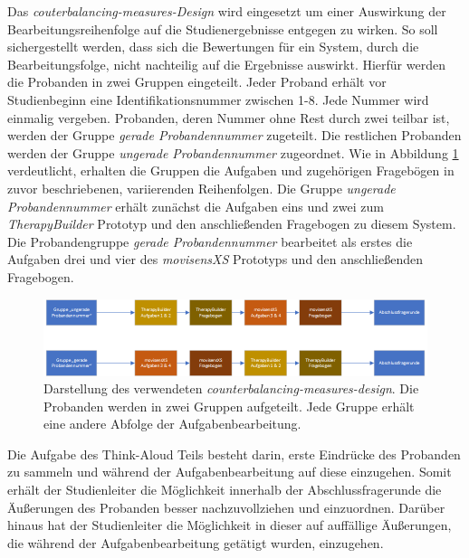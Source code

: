 Das \emph{couterbalancing-measures-Design} wird eingesetzt um einer Auswirkung der Bearbeitungsreihenfolge auf die Studienergebnisse entgegen zu wirken. So soll sichergestellt werden, dass sich die Bewertungen für ein System, durch die Bearbeitungsfolge, nicht nachteilig auf die Ergebnisse auswirkt. Hierfür werden die Probanden in zwei Gruppen eingeteilt. Jeder Proband erhält vor Studienbeginn eine Identifikationsnummer zwischen 1-8. Jede Nummer wird einmalig vergeben. Probanden, deren Nummer ohne Rest durch zwei teilbar ist, werden der Gruppe \emph{gerade Probandennummer} zugeteilt. Die restlichen Probanden werden der Gruppe \emph{ungerade Probandennummer} zugeordnet. Wie in Abbildung \ref{counterbalancing} verdeutlicht, erhalten die Gruppen die Aufgaben und zugehörigen Fragebögen in zuvor beschriebenen, variierenden Reihenfolgen. Die Gruppe \emph{ungerade Probandennummer} erhält zunächst die Aufgaben eins und zwei zum \emph{TherapyBuilder} Prototyp und den anschließenden Fragebogen zu diesem System. Die Probandengruppe \emph{gerade Probandennummer} bearbeitet als erstes die Aufgaben drei und vier des \emph{movisensXS} Prototyps und den anschließenden Fragebogen. 

\begin{figure}[h]
\centering
\includegraphics[width=1\textwidth]{pictures/diagramme/counterbalancing-measure-design}
\caption{Darstellung des verwendeten \emph{counterbalancing-measures-design}. Die Probanden werden in zwei Gruppen aufgeteilt. Jede Gruppe erhält eine andere Abfolge der Aufgabenbearbeitung.}
\label{counterbalancing}
\end{figure}

Die Aufgabe des Think-Aloud Teils besteht darin, erste Eindrücke des Probanden zu sammeln und während der Aufgabenbearbeitung auf diese einzugehen. Somit erhält der Studienleiter die Möglichkeit innerhalb der Abschlussfragerunde die Äußerungen des Probanden besser nachzuvollziehen und einzuordnen. Darüber hinaus hat der Studienleiter die Möglichkeit in dieser auf auffällige Äußerungen, die während der Aufgabenbearbeitung getätigt wurden, einzugehen. 

